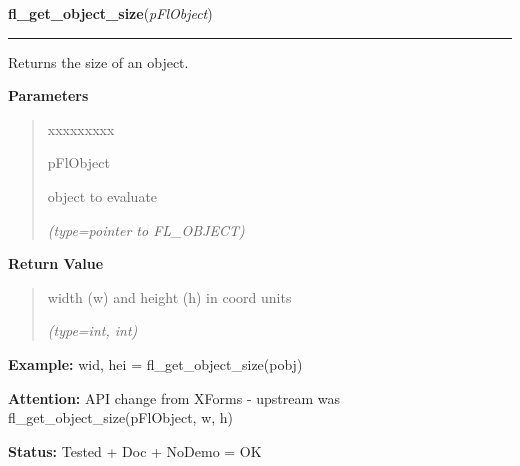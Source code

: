 \hspace{.8\funcindent}\begin{boxedminipage}{\funcwidth}

    \raggedright \textbf{fl\_get\_object\_size}(\textit{pFlObject})

    \vspace{-1.5ex}

    \rule{\textwidth}{0.5\fboxrule}
\setlength{\parskip}{2ex}
    Returns the size of an object.

\setlength{\parskip}{1ex}
      \textbf{Parameters}
      \vspace{-1ex}

      \begin{quote}
        \begin{Ventry}{xxxxxxxxx}

          \item[pFlObject]

          object to evaluate

            {\it (type=pointer to FL\_OBJECT)}

        \end{Ventry}

      \end{quote}

      \textbf{Return Value}
    \vspace{-1ex}

      \begin{quote}
      width (w) and height (h) in coord units

      {\it (type=int, int)}

      \end{quote}

\textbf{Example:} wid, hei = fl\_get\_object\_size(pobj)



\textbf{Attention:} API change from XForms - upstream was fl\_get\_object\_size(pFlObject, w, 
h)



\textbf{Status:} Tested + Doc + NoDemo = OK



    \end{boxedminipage}

    \label{xformslib:flbasic:fl_set_object_size}

    \vspace{0.5ex}

